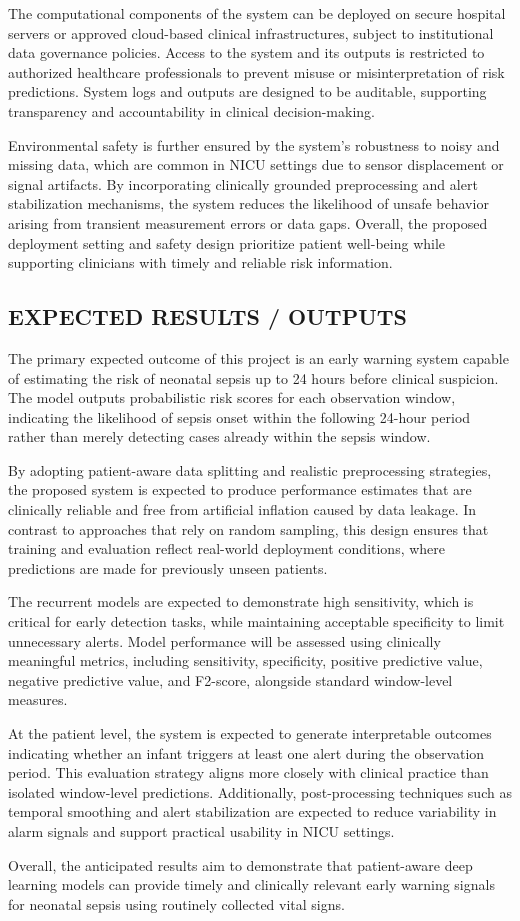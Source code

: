 The computational components of the system can be deployed on secure hospital servers or approved cloud-based clinical infrastructures, subject to institutional data governance policies. Access to the system and its outputs is restricted to authorized healthcare professionals to prevent misuse or misinterpretation of risk predictions. System logs and outputs are designed to be auditable, supporting transparency and accountability in clinical decision-making.

Environmental safety is further ensured by the system’s robustness to noisy and missing data, which are common in NICU settings due to sensor displacement or signal artifacts. By incorporating clinically grounded preprocessing and alert stabilization mechanisms, the system reduces the likelihood of unsafe behavior arising from transient measurement errors or data gaps. Overall, the proposed deployment setting and safety design prioritize patient well-being while supporting clinicians with timely and reliable risk information.

\subsection{EXPECTED RESULTS / OUTPUTS}

The primary expected outcome of this project is an early warning system capable of estimating the risk of neonatal sepsis up to 24 hours before clinical suspicion. The model outputs probabilistic risk scores for each observation window, indicating the likelihood of sepsis onset within the following 24-hour period rather than merely detecting cases already within the sepsis window.

By adopting patient-aware data splitting and realistic preprocessing strategies, the proposed system is expected to produce performance estimates that are clinically reliable and free from artificial inflation caused by data leakage. In contrast to approaches that rely on random sampling, this design ensures that training and evaluation reflect real-world deployment conditions, where predictions are made for previously unseen patients.

The recurrent models are expected to demonstrate high sensitivity, which is critical for early detection tasks, while maintaining acceptable specificity to limit unnecessary alerts. Model performance will be assessed using clinically meaningful metrics, including sensitivity, specificity, positive predictive value, negative predictive value, and F2-score, alongside standard window-level measures.

At the patient level, the system is expected to generate interpretable outcomes indicating whether an infant triggers at least one alert during the observation period. This evaluation strategy aligns more closely with clinical practice than isolated window-level predictions. Additionally, post-processing techniques such as temporal smoothing and alert stabilization are expected to reduce variability in alarm signals and support practical usability in NICU settings.

Overall, the anticipated results aim to demonstrate that patient-aware deep learning models can provide timely and clinically relevant early warning signals for neonatal sepsis using routinely collected vital signs.
